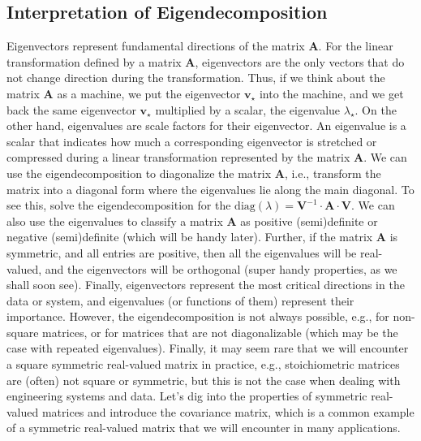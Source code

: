 \documentclass{article}[11pt]
\begin{document}
\subsection{Interpretation of Eigendecomposition}
Eigenvectors represent fundamental directions of the matrix $\mathbf{A}$. For the linear transformation defined by a matrix $\mathbf{A}$, eigenvectors are the only vectors that do not change direction during the transformation. 
Thus, if we think about the matrix $\mathbf{A}$ as a machine, we put the eigenvector $\mathbf{v}_{\star}$ into the machine, and we get back the same eigenvector $\mathbf{v}_{\star}$ multiplied by a scalar, the eigenvalue $\lambda_{\star}$.
On the other hand, eigenvalues are scale factors for their eigenvector. An eigenvalue is a scalar that indicates how much a corresponding eigenvector is stretched or compressed during a linear transformation represented by the matrix $\mathbf{A}$.
We can use the eigendecomposition to diagonalize the matrix $\mathbf{A}$, i.e., transform the matrix into a diagonal form where the eigenvalues lie along the main diagonal. To see this, solve the eigendecomposition for the $\text{diag}(\lambda) = \mathbf{V}^{-1}\cdot\mathbf{A}\cdot\mathbf{V}$. 
We can also use the eigenvalues to classify a matrix $\mathbf{A}$ as positive (semi)definite or negative (semi)definite (which will be handy later). 
Further, if the matrix $\mathbf{A}$ is symmetric, and all entries are positive, then all the eigenvalues will be real-valued, and the eigenvectors will be orthogonal (super handy properties, as we shall soon see).
Finally, eigenvectors represent the most critical directions in the data or system, and eigenvalues (or functions of them) represent their importance. 
However, the eigendecomposition is not always possible, e.g., for non-square matrices, or for matrices that are not diagonalizable (which may be the case with repeated eigenvalues).
Finally, it may seem rare that we will encounter a square symmetric real-valued matrix in practice, e.g., stoichiometric
matrices are (often) not square or symmetric, but this is not the case when dealing with engineering systems and data.
Let's dig into the properties of symmetric real-valued matrices and introduce the covariance matrix, which is a common example of a symmetric real-valued matrix that we will encounter in many applications.
\end{document}
